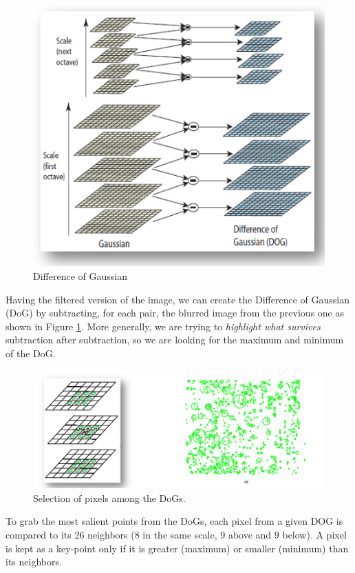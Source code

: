 \begin{figure}[H]
    \centering
    \includegraphics[scale=0.5]{Figures/dog.png}
    \caption{Difference of Gaussian}
    \label{fig:dog}
\end{figure}

Having the filtered version of the image, we can create the Difference of Gaussian (DoG) by subtracting, for each pair, the blurred image from the previous one as shown in Figure \ref{fig:dog}.
More generally, we are trying to \textit{highlight what survives} subtraction after subtraction, so we are looking for the maximum and minimum of the DoG.

\begin{figure}[H]
    \centering
    \includegraphics[scale=0.4]{Figures/dogs2.png}
    \caption{Selection of pixels among the DoGs.}
    \label{fig:dogs2}
\end{figure}

To grab the most salient points from the DoGs, each pixel from a given DOG is compared to its 26 neighbors ($8$ in the same scale, $9$ above and $9$ below).
A pixel is kept as a key-point only if it is greater (maximum) or smaller (minimum) than its neighbors.

